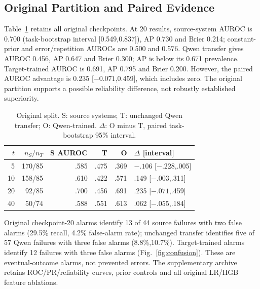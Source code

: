 \documentclass[conference]{IEEEtran}
\begin{document}
\subsection{Original Partition and Paired Evidence}
Table~\ref{tab:original} retains all original checkpoints. At 20 results, source-system AUROC is 0.700 (task-bootstrap interval [0.549,0.837]), AP 0.730 and Brier 0.214; constant-prior and error/repetition AUROCs are 0.500 and 0.576. Qwen transfer gives AUROC 0.456, AP 0.647 and Brier 0.300; AP is below its 0.671 prevalence. Target-trained AUROC is 0.691, AP 0.795 and Brier 0.200. However, the paired AUROC advantage is 0.235 [${-}0.071$,0.459], which includes zero. The original partition supports a possible reliability difference, not robustly established superiority.

\begin{table}[t]
\centering\footnotesize
\caption{Original split. S: source systems; T: unchanged Qwen transfer; O: Qwen-trained. $\Delta$: O minus T, paired task-bootstrap 95\% interval.}
\label{tab:original}
\begin{tabular}{@{}rrrrrl@{}}\toprule
$t$ & $n_S/n_T$ & S AUROC & T & O & $\Delta$ [interval] \\
\midrule
5 & 170/85 & .585 & .475 & .369 & ${-}.106$ [${-}.228$,.005] \\
10 & 158/85 & .610 & .422 & .571 & .149 [${-}.003$,.311] \\
20 & 92/85 & .700 & .456 & .691 & .235 [${-}.071$,.459] \\
40 & 50/74 & .588 & .551 & .613 & .062 [${-}.055$,.184] \\
\bottomrule\end{tabular}
\end{table}

Original checkpoint-20 alarms identify 13 of 44 source failures with two false alarms (29.5\% recall, 4.2\% false-alarm rate); unchanged transfer identifies five of 57 Qwen failures with three false alarms (8.8\%,10.7\%). Target-trained alarms identify 12 failures with three false alarms (Fig.~\ref{fig:confusion}). These are eventual-outcome alarms, not prevented errors. The supplementary archive retains ROC/PR/reliability curves, prior controls and all original LR/HGB feature ablations.
\end{document}
